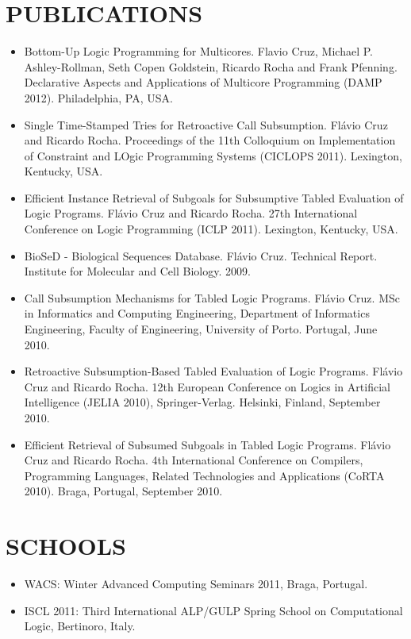 \documentclass[margin]{res}
\begin{document}
\begin{resume}
\section{PUBLICATIONS}
   \begin{itemize}
      \item Bottom-Up Logic Programming for Multicores. Flavio Cruz, Michael P. Ashley-Rollman, Seth Copen Goldstein, Ricardo Rocha and Frank Pfenning. Declarative Aspects and Applications of Multicore Programming (DAMP 2012). Philadelphia, PA, USA.
      \item Single Time-Stamped Tries for Retroactive Call Subsumption. Flávio Cruz and Ricardo Rocha. Proceedings of the 11th Colloquium on Implementation of Constraint and LOgic Programming Systems (CICLOPS 2011). Lexington, Kentucky, USA.
      \item Efficient Instance Retrieval of Subgoals for Subsumptive Tabled Evaluation of Logic Programs. Flávio Cruz and Ricardo Rocha. 27th International Conference on Logic Programming (ICLP 2011). Lexington, Kentucky, USA.
      \item BioSeD - Biological Sequences Database. Flávio Cruz. Technical Report. Institute for Molecular and Cell Biology. 2009.
      \item Call Subsumption Mechanisms for Tabled Logic Programs. Flávio Cruz. MSc in Informatics and Computing Engineering, Department of Informatics Engineering, Faculty of Engineering, University of Porto. Portugal, June 2010.
      \item Retroactive Subsumption-Based Tabled Evaluation of Logic Programs.
      Flávio Cruz and Ricardo Rocha. 12th European Conference on Logics in Artificial Intelligence (JELIA 2010), Springer-Verlag. Helsinki, Finland, September 2010.
      \item Efficient Retrieval of Subsumed Subgoals in Tabled Logic Programs.
      Flávio Cruz and Ricardo Rocha. 4th International Conference on Compilers, Programming Languages, Related Technologies and Applications (CoRTA 2010). Braga, Portugal, September 2010.
   \end{itemize}
   
\section{SCHOOLS}
   \begin{itemize}
      \item WACS: Winter Advanced Computing Seminars 2011, Braga, Portugal.
      \item ISCL 2011: Third International ALP/GULP Spring School on Computational Logic, Bertinoro, Italy.
   \end{itemize}


\end{resume}
\end{document}
